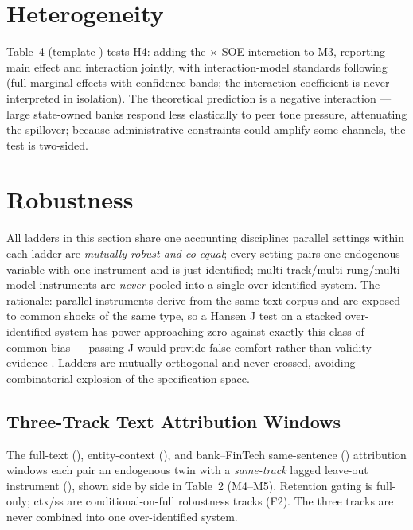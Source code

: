 \section{Heterogeneity}\label{sec:het}

Table~4 (template ) tests H4: adding the 
$\times$ SOE interaction to M3, reporting main effect and interaction jointly, with
interaction-model standards following \textcite{brambor2006understanding} (full marginal
effects with confidence bands; the interaction coefficient is never interpreted in isolation).
The theoretical prediction is a negative interaction --- large state-owned banks respond less
elastically to peer tone pressure, attenuating the spillover; because administrative
constraints could amplify some channels, the test is two-sided.

\section{Robustness}\label{sec:robust}

All ladders in this section share one accounting discipline: parallel settings within each
ladder are \emph{mutually robust and co-equal}; every setting pairs one endogenous variable
with one instrument and is just-identified; multi-track/multi-rung/multi-model instruments are
\emph{never} pooled into a single over-identified system. The rationale: parallel instruments
derive from the same text corpus and are exposed to common shocks of the same type, so a
Hansen J test on a stacked over-identified system has power approaching zero against exactly
this class of common bias --- passing J would provide false comfort rather than validity
evidence . Ladders are mutually orthogonal and
never crossed, avoiding combinatorial explosion of the specification space.

\subsection{Three-Track Text Attribution Windows}
The full-text (), entity-context (), and bank--FinTech same-sentence
() attribution windows each pair an endogenous twin with a \emph{same-track}
lagged leave-out instrument (), shown side by side in
Table~2 (M4--M5). Retention gating is full-only; ctx/ss are conditional-on-full robustness
tracks (F2). The three tracks are never combined into one over-identified system.

